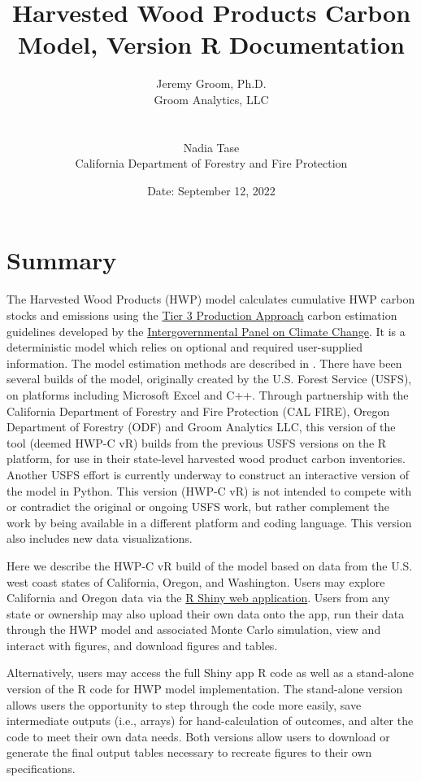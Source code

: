 \documentclass[
  openany]{book}
\title{Harvested Wood Products Carbon Model, Version R Documentation}
\author{Jeremy Groom, Ph.D.\\
Groom Analytics, LLC\\
\strut \\
Nadia Tase\\
California Department of Forestry and Fire Protection}
\date{Date: September 12, 2022}
\begin{document}
\maketitle

{
\setcounter{tocdepth}{1}
\tableofcontents
}
\hypertarget{sum}{%
\chapter{Summary}\label{sum}}

The Harvested Wood Products (HWP) model calculates cumulative HWP carbon stocks and emissions using the \href{https://www.ipcc-nggip.iges.or.jp/public/2006gl/pdf/4_Volume4/V4_04_Ch4_Forest_Land.pdf}{Tier 3 Production Approach} carbon estimation guidelines developed by the \href{https://www.ipcc.ch/}{Intergovernmental Panel on Climate Change}. It is a deterministic model which relies on optional and required user-supplied information. The model estimation methods are described in \textcite{stockmann2012}. There have been several builds of the model, originally created by the U.S. Forest Service (USFS), on platforms including Microsoft Excel and C++. Through partnership with the California Department of Forestry and Fire Protection (CAL FIRE), Oregon Department of Forestry (ODF) and Groom Analytics LLC, this version of the tool (deemed HWP-C vR) builds from the previous USFS versions on the R \autocite{R-base} platform, for use in their state-level harvested wood product carbon inventories. Another USFS effort is currently underway to construct an interactive version of the model in Python. This version (HWP-C vR) is not intended to compete with or contradict the original or ongoing USFS work, but rather complement the work by being available in a different platform and coding language. This version also includes new data visualizations.

Here we describe the HWP-C vR build of the model based on data from the U.S. west coast states of California, Oregon, and Washington. Users may explore California and Oregon data via the \href{https://groomanalyticsllc.shinyapps.io/HWP-C-vR/}{R Shiny web application}. Users from any state or ownership may also upload their own data onto the app, run their data through the HWP model and associated Monte Carlo simulation, view and interact with figures, and download figures and tables.

Alternatively, users may access the full Shiny app R code as well as a stand-alone version of the R code for HWP model implementation. The stand-alone version allows users the opportunity to step through the code more easily, save intermediate outputs (i.e., arrays) for hand-calculation of outcomes, and alter the code to meet their own data needs. Both versions allow users to download or generate the final output tables necessary to recreate figures to their own specifications.
\end{document}
